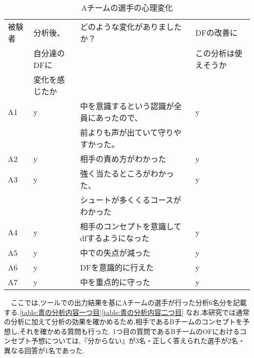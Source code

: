 \documentclass[../main.tex]{subfiles}
\begin{document}
\begin{table}[h]
  \caption{Aチームの選手の心理変化}\label{table:青チームの心理変化}
  \begin{tabular}{llll}
    \hline\hline
  被験者 & 分析後、& どのような変化がありましたか？ & DFの改善に\\
  & 自分達のDFに & & この分析は使えそうか \\
  & 変化を感じたか & & \\
  \hline\hline
  A1     & y & 中を意識するという認識が全員にあったので、& y \\
  & & 前よりも声が出ていて守りやすかった。 &  \\
  A2     & y & 相手の責め方がわかった & y \\
  A3     & y & 強く当たるところがわかった、 & y \\
  & & シュートが多くくるコースがわかった & \\
  A4     & y & 相手のコンセプトを意識してdfするようになった & y \\
  A5     & y & 中での失点が減った & y \\
  A6     & y & DFを意識的に行えた & y \\
  A7     & y & 中を重点的に守った & y \\
  \hline
  \end{tabular}
  \end{table}


\par　ここでは,ツールでの出力結果を基にAチームの選手が行った分析6名分を記載する.\ref{table:青の分析内容一つ目}\ref{table:青の分析内容二つ目}
なお,本研究では通常の分析に加えて分析の効果を確かめるため,相手であるBチームのコンセプトを予想し,それを確かめる質問も行った.
1つ目の質問であるBチームのOFにおけるコンセプト予想については,『分からない』が3名・正しく答えられた選手が2名・異なる回答が1名であった.
\end{document}
